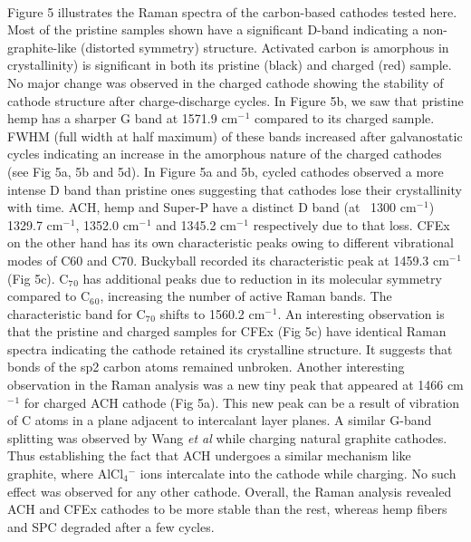 \documentclass{article}
\begin{document}
\\Figure 5 illustrates the Raman spectra of the carbon-based cathodes tested here. Most of the pristine samples shown have a significant D-band indicating a non-graphite-like (distorted symmetry) structure.  Activated carbon is amorphous in crystallinity) is significant in both its pristine (black) and charged (red) sample. No major change was observed in the charged cathode showing the stability of cathode structure after charge-discharge cycles. In Figure 5b, we saw that pristine hemp has a sharper G band at 1571.9 cm$^-{^1}$ compared to its charged sample. FWHM (full width at half maximum) of these bands increased after galvanostatic cycles indicating an increase in the amorphous nature of the charged cathodes (see Fig 5a, 5b and 5d). In Figure 5a and 5b, cycled cathodes observed a more intense D band than pristine ones suggesting that cathodes lose their crystallinity with time. ACH, hemp and Super-P have a distinct D band (at ~1300 cm$^-{^1}$) 1329.7 cm$^-{^1}$, 1352.0 cm$^-{^1}$ and 1345.2 cm$^-{^1}$ respectively due to that loss. CFEx on the other hand has its own characteristic peaks owing to different vibrational modes of C60 and C70. Buckyball recorded its characteristic peak at 1459.3 cm$^-{^1}$ (Fig 5c). C$_7{_0}$ has additional peaks due to reduction in its molecular symmetry compared to C$_6{_0}$, increasing the number of active Raman bands. The characteristic band for C$_7{_0}$ shifts to 1560.2 cm$^-{^1}$. An interesting observation is that the pristine and charged samples for CFEx (Fig 5c) have identical Raman spectra indicating the cathode retained its crystalline structure. It suggests that bonds of the sp2 carbon atoms remained unbroken. Another interesting observation in the Raman analysis was a new tiny peak that appeared at 1466 cm$^-{^1}$ for charged ACH cathode (Fig 5a). This new peak can be a result of vibration of C atoms in a plane adjacent to intercalant layer planes. A similar G-band splitting was observed by Wang \textit{et al} while charging natural graphite cathodes. Thus establishing the fact that ACH undergoes a similar mechanism like graphite, where AlCl$_4{^-}$ ions intercalate into the cathode while charging. No such effect was observed for any other cathode. Overall, the Raman analysis revealed ACH and CFEx cathodes to be more stable than the rest, whereas hemp fibers and SPC degraded after a few cycles. 
\end{document}
